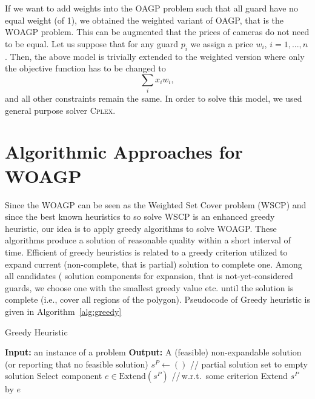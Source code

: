 \documentclass[runningheads,a4paper]{llncs}
\begin{document}
     If we want to add weights into the OAGP problem such that all guard have no equal weight (of 1), we obtained the weighted variant of OAGP, that is the WOAGP problem. This can be augmented that the prices of cameras do not need to be equal.  Let us suppose that for any guard $p_i$ we assign a price $w_i$, $i=1,...,n$. Then, the above model is trivially extended to the weighted version where only the objective function has to be changed to
     $$ \sum_{i} x_i w_i,$$
      and all other constraints remain the same.
      In order to solve this model, we used general purpose solver \textsc{Cplex}. 
     \section{Algorithmic Approaches for WOAGP}
          Since the WOAGP can be seen as the Weighted Set Cover problem (WSCP) and since the best known heuristics to so solve WSCP is an enhanced greedy heuristic, our idea is to apply greedy algorithms to solve WOAGP. These algorithms produce a solution of reasonable quality within a short interval of time. Efficient of greedy heuristics is related to a greedy criterion utilized to expand current (non-complete, that is partial) solution to complete one. Among all candidates ( solution components for expansion, that is not-yet-considered guards, we choose one with the smallest greedy value etc. until the solution is complete (i.e., cover all regions of the polygon).
          Pseudocode of Greedy heuristic is given in Algorithm~\ref{alg:greedy}
          
          \begin{algorithm}[!t] 
          	\caption{Greedy Heuristic}\label{alg:greedy}
          	\begin{algorithmic}[1]
          		\State \textbf{Input:} an instance of a problem
          		\State \textbf{Output:} A (feasible) non-expandable solution (or reporting that no feasible solution)
          		\State $s^{P} \gets ()$ \hspace{0.3cm}// partial solution set to empty solution
          		\State Select component $e \in  \text{Extend}(s^{P})$ \hspace{0.3cm}//\,w.r.t.\  some criterion
          		\State Extend $s^{P}$ by $e$
          		\EndWhile
          	\end{algorithmic}
          \end{algorithm}
\end{document}
